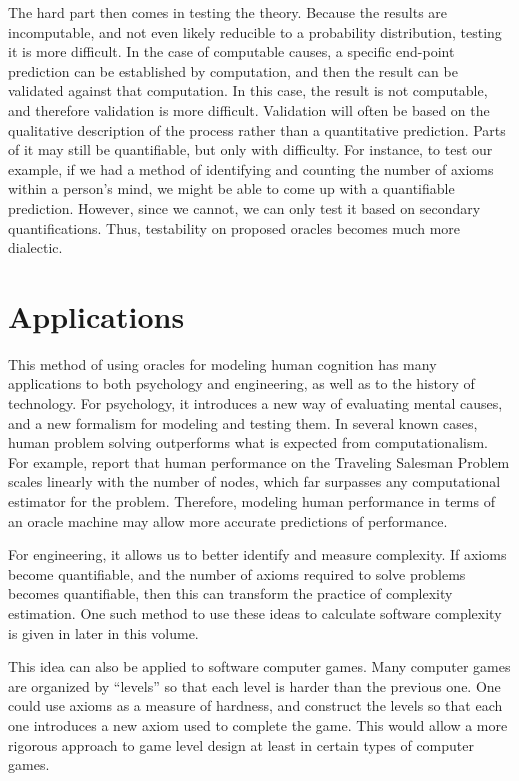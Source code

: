The hard part then comes in testing the theory.  Because the results are incomputable, and not even likely reducible to a probability distribution, testing it is more difficult.  In the case of computable causes, a specific end-point prediction can be established by computation, and then the result can be validated against that computation.  In this case, the result is not computable, and therefore validation is more difficult.  Validation will often be based on the qualitative description of the process rather than a quantitative prediction.  Parts of it may still be quantifiable, but only with difficulty.  For instance, to test our example, if we had a method of identifying and counting the number of axioms within a person's mind, we might be able to come up with a quantifiable prediction.  However, since we cannot, we can only test it based on secondary quantifications.  Thus, testability on proposed oracles becomes much more dialectic.

\section{Applications}

This method of using oracles for modeling human cognition has many applications to both psychology and engineering, as well as to the history of technology.  For psychology, it introduces a new way of evaluating mental causes, and a new formalism for modeling and testing them.  In several known cases, human problem solving outperforms what is expected from computationalism.  For example, \citet{dryetal2006} report that human performance on the Traveling Salesman Problem scales linearly with the number of nodes, which far surpasses any computational estimator for the problem.  Therefore, modeling human performance in terms of an oracle machine may allow more accurate predictions of performance.

For engineering, it allows us to better identify and measure complexity.  If axioms become quantifiable, and the number of axioms required to solve problems becomes quantifiable, then this can transform the practice of complexity estimation.  One such method to use these ideas to calculate software complexity is given in \citet{bartlett2012} later in this volume.  

This idea can also be applied to software computer games.  Many computer games are organized by ``levels'' so that each level is harder than the previous one.  One could use axioms as a measure of hardness, and construct the levels so that each one introduces a new axiom used to complete the game.  This would allow a more rigorous approach to game level design at least in certain types of computer games.

